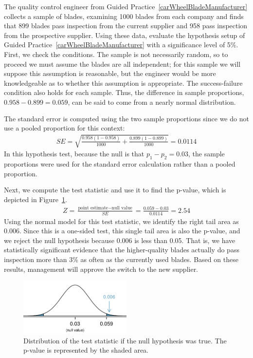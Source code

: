 \begin{example}{The quality control engineer from Guided Practice~\ref{carWheelBladeManufacturer} collects a sample of blades, examining 1000 blades from each company and finds that 899 blades pass inspection from the current supplier and 958 pass inspection from the prospective supplier. Using these data, evaluate the hypothesis setup of Guided Practice~\ref{carWheelBladeManufacturer} with a significance level of 5\%.}\label{qualityCtrlEngHypothesisEval}
First, we check the conditions. The sample is not necessarily random, so to proceed we must assume the blades are all independent; for this sample we will suppose this assumption is reasonable, but the engineer would be more knowledgeable as to whether this assumption is appropriate. The success-failure condition also holds for each sample. Thus, the difference in sample proportions, $0.958 - 0.899 = 0.059$, can be said to come from a nearly normal distribution.

The standard error is computed using the two sample proportions since we do not use a pooled proportion for this context:
\begin{align*}
SE = \sqrt{\frac{0.958(1-0.958)}{1000} + \frac{0.899(1-0.899)}{1000}} = 0.0114
\end{align*}
In this hypothesis test, because the null is that $p_1 - p_2 = 0.03$, the sample proportions were used for the standard error calculation rather than a pooled proportion.

Next, we compute the test statistic and use it to find the p-value, which is depicted in Figure~\ref{bladesTwoSampleHTPValueQC}.
\begin{align*}
Z = \frac{\text{point estimate} - \text{null value}}{SE}
    = \frac{0.059 - 0.03}{0.0114} = 2.54
\end{align*}
Using the normal model for this test statistic, we identify the right tail area as 0.006. Since this is a one-sided test, this single tail area is also the p-value, and we reject the null hypothesis because 0.006 is less than 0.05. That is, we have statistically significant evidence that the higher-quality blades actually do pass inspection more than 3\% as often as the currently used blades. Based on these results, management will approve the switch to the new supplier.
\end{example}

\begin{figure}
\centering
\includegraphics[width=0.5\textwidth]{ch_inference_for_props/figures/bladesTwoSampleHTPValueQC/bladesTwoSampleHTPValueQC}
\caption{Distribution of the test statistic if the null hypothesis was true. The p-value is represented by the shaded area.}
\label{bladesTwoSampleHTPValueQC}
\end{figure}



